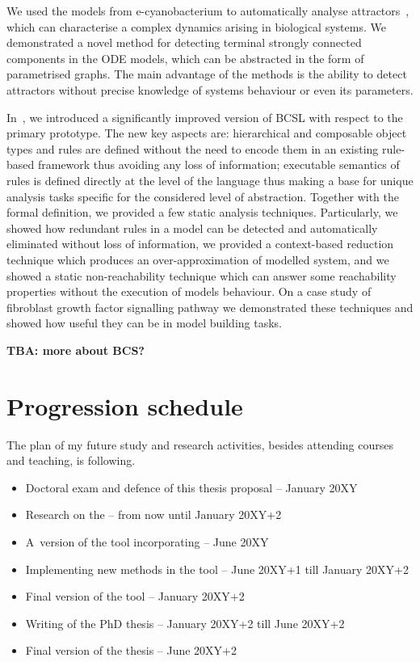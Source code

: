 \documentclass[11pt,a4paper]{report}
\begin{document}
We used the models from e-cyanobacterium to automatically analyse attractors~\cite{benevs2018fully}, which can characterise a complex dynamics arising in biological systems. We demonstrated a novel method for detecting terminal strongly connected components in the ODE models, which can be abstracted in the form of parametrised graphs. The main advantage of the methods is the ability to detect attractors without precise knowledge of systems behaviour or even its parameters.

In~\cite{trojak2018sasb}, we introduced a significantly improved version of BCSL with respect to the primary prototype. The new key aspects are: hierarchical and composable object types and rules are defined without the need to encode them in an existing rule-based framework thus avoiding any loss of information; executable semantics of rules is defined directly at the level of the language thus making a base for unique analysis tasks specific for the considered level of abstraction. Together with the formal definition, we provided a few static analysis techniques. Particularly, we showed how redundant rules in a model can be detected and automatically eliminated without loss of information, we provided a context-based reduction technique which produces an over-approximation of modelled system, and we showed a static non-reachability technique which can answer some reachability properties without the execution of models behaviour. On a case study of fibroblast growth factor signalling pathway we demonstrated these techniques and showed how useful they can be in model building tasks.

\textbf{TBA: more about BCS?}

\section{Progression schedule}

The plan of my future study and research activities, besides attending
courses and teaching, is following.

\begin{itemize}
\item Doctoral exam and defence of this thesis proposal -- January 20XY
\item Research on the  -- from now until January 20XY+2
\item A~version of the tool incorporating -- June 20XY
\item Implementing new methods in the tool -- June 20XY+1 till January 20XY+2
\item Final version of the tool -- January 20XY+2
\item Writing of the PhD thesis -- January 20XY+2 till June 20XY+2
\item Final version of the thesis -- June 20XY+2
\end{itemize}
\end{document}
